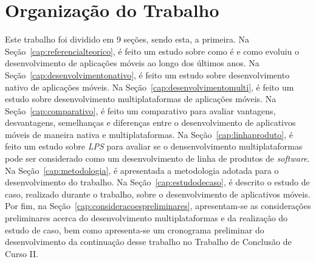 
\section{Organização do Trabalho}\label{sec:organizacao}

Este trabalho foi dividido em 9 seções, sendo esta, a primeira. Na Seção~\ref{cap:referencialteorico}, é feito um estudo sobre como é e como evoluiu o desenvolvimento de aplicações móveis ao longo dos últimos anos. 
Na Seção~\ref{cap:desenvolvimentonativo}, é feito um estudo sobre desenvolvimento nativo de aplicações móveis.
Na Seção~\ref{cap:desenvolvimentomulti}, é feito um estudo sobre desenvolvimento multiplataformas de aplicações móveis.
Na Seção~\ref{cap:comparativo}, é feito um comparativo para avaliar vantagens, desvantagens, semelhanças e diferenças entre o desenvolvimento de aplicativos móveis de maneira nativa e multiplataformas.  
Na Seção~\ref{cap:linhaproduto}, é feito um estudo sobre \textit{LPS} para avaliar se o densenvolvimento multiplataformas pode ser considerado como um desenvolvimento de linha de produtos de \textit{software}.
Na Seção~\ref{cap:metodologia}, é apresentada a metodologia adotada para o desenvolvimento do trabalho.  
Na Seção~\ref{cap:estudodecaso}, é descrito o estudo de caso, realizado durante o trabalho, sobre o desenvolvimento de aplicativos móveis.
Por fim, na Seção~\ref{cap:consideracoespreliminares}, apresentam-se as considerações preliminares acerca do desenvolvimento multiplataformas e da realização do estudo de caso, bem como apresenta-se um 
cronograma preliminar do desenvolvimento da continuação desse trabalho no Trabalho de Conclusão de Curso II. 